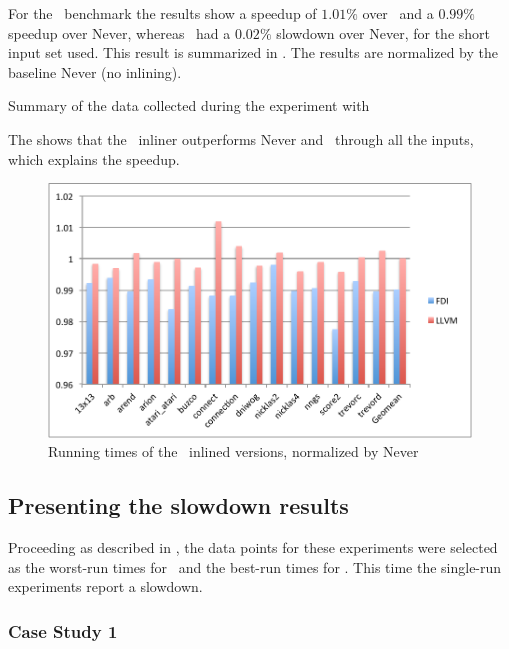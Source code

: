 For the \gobmk\ benchmark the results show a speedup of $1.01 \%$ over \llvm\, and a $0.99 \%$ speedup over Never, whereas \llvm\ had a $0.02 \%$ slowdown over Never, for the short input set used. This result is summarized in . The results are normalized by the baseline Never (no inlining).

\begin{table}
  \centering
  \begin{tiny}
  
  \end{tiny}
  \caption{Summary of the data collected during the experiment with \gobmk}
  \label{tab:speedupgobmk}
\end{table}

The  shows that the \FDI\ inliner outperforms Never and \llvm\ through all the inputs, which explains the speedup.

\begin{figure}
  \centering
  \includegraphics[width=1.00\linewidth]{Figures/speedupgbkall}
  \caption{Running times of the \gobmk\ inlined versions, normalized by Never}
  \label{fig:speedupgobmk}
\end{figure}


\subsection{Presenting the slowdown results}
\label{sec:slowdown}

Proceeding as described in , the data points for these experiments were selected as the worst-run times for \FDI\ and the best-run times for \llvm. This time the single-run experiments report a slowdown.

\subsubsection{Case Study 1 \gcc}

